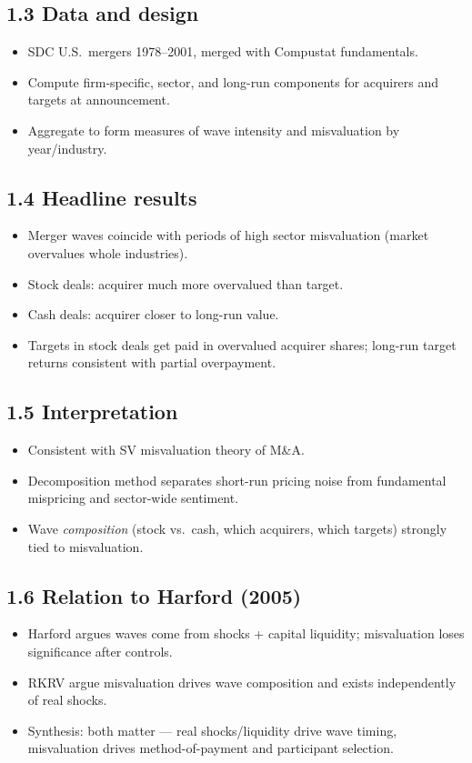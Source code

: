 \documentclass[11pt]{article}
\begin{document}
\subsection*{1.3 Data and design}
\begin{itemize}
\item SDC U.S.\ mergers 1978--2001, merged with Compustat fundamentals.
\item Compute firm-specific, sector, and long-run components for acquirers and targets at announcement.
\item Aggregate to form measures of wave intensity and misvaluation by year/industry.
\end{itemize}

\subsection*{1.4 Headline results}
\begin{itemize}
\item Merger waves coincide with periods of high sector misvaluation (market overvalues whole industries).
\item Stock deals: acquirer much more overvalued than target.
\item Cash deals: acquirer closer to long-run value.
\item Targets in stock deals get paid in overvalued acquirer shares; long-run target returns consistent with partial overpayment.
\end{itemize}

\subsection*{1.5 Interpretation}
\begin{itemize}
\item Consistent with SV misvaluation theory of M\&A.
\item Decomposition method separates short-run pricing noise from fundamental mispricing and sector-wide sentiment.
\item Wave \emph{composition} (stock vs.\ cash, which acquirers, which targets) strongly tied to misvaluation.
\end{itemize}

\subsection*{1.6 Relation to Harford (2005)}
\begin{itemize}
\item Harford argues waves come from shocks + capital liquidity; misvaluation loses significance after controls.
\item RKRV argue misvaluation drives wave composition and exists independently of real shocks.
\item Synthesis: both matter --- real shocks/liquidity drive wave timing, misvaluation drives method-of-payment and participant selection.
\end{itemize}
\end{document}
